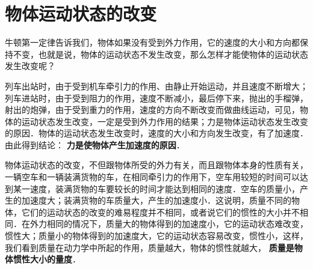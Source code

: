 \section{物体运动状态的改变}
牛顿第一定律告诉我们，物体如果没有受到外力作用，它的速度的大小和方向都保持不变，也就是说，物体的运动状态不发生改变，那么怎样才能使物体的运动状态发生改变呢？

列车出站时，由于受到机车牵引力的作用、由静止开始运动，并且速度不断增大；列车进站时，由于受到阻力的作用，速度不断减小，最后停下来，抛出的手榴弹，射出的炮弹，由于受到重力的作用，速度的方向不断改变而做曲线运动，可见，物体的运动状态发生改变，一定是受到外力作用的结果；力是物体运动状态发生改变的原因．物体的运动状态发生改变时，速度的大小和方向发生改变，有了加速度．由此得到结论：\textbf{ 力是使物体产生加速度的原因}．

物体运动状态的改变，不但跟物体所受的外力有关，而且跟物体本身的性质有关，一辆空车和一辆装满货物的车，在相同牵引力的作用下，空车用较短的时间可以达到某一速度，装满货物的车要较长的时间才能达到相同的速度．空车的质量小，产生的加速度大；装满货物的车质量大，产生的加速度小．这说明，质量不同的物体，它们的运动状态的改变的难易程度并不相同，或者说它们的惯性的大小并不相同．在外力相同的情况下，质量大的物体得到的加速度小，它的运动状态难改变，惯性大；质量小的物体得到的加速度大，它的运动状态容易改变，惯性小，这样，我们看到质量在动力学中所起的作用，质量越大，物体的惯性就越大，\textbf{ 质量是物体惯性大小的量度}．

